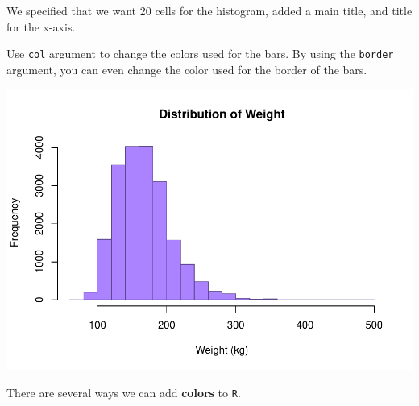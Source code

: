 \documentclass[
]{book}
\newenvironment{Shaded}{\begin{snugshade}}{\end{snugshade}}
\newcommand{\DataTypeTok}[1]{\textcolor[rgb]{0.13,0.29,0.53}{#1}}
\newcommand{\DecValTok}[1]{\textcolor[rgb]{0.00,0.00,0.81}{#1}}
\newcommand{\KeywordTok}[1]{\textcolor[rgb]{0.13,0.29,0.53}{\textbf{#1}}}
\newcommand{\NormalTok}[1]{#1}
\newcommand{\OperatorTok}[1]{\textcolor[rgb]{0.81,0.36,0.00}{\textbf{#1}}}
\newcommand{\StringTok}[1]{\textcolor[rgb]{0.31,0.60,0.02}{#1}}
\begin{document}
We specified that we want 20 cells for the histogram, added a main title, and title for the x-axis.

Use \texttt{col} argument to change the colors used for the bars. By using the \texttt{border} argument, you can even change the color used for the border of the bars.

\begin{Shaded}
\end{Shaded}

\includegraphics{_main_files/figure-latex/unnamed-chunk-125-1.pdf}

There are several ways we can add \textbf{colors} to \texttt{R}.
\end{document}
